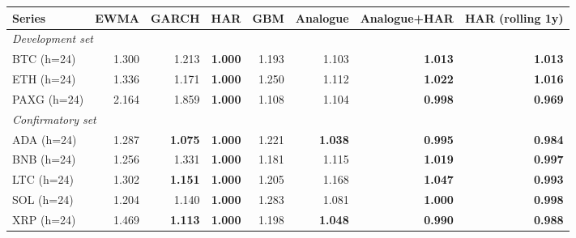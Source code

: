 \begin{tabular}{lrrrrrrr}
\toprule
Series & EWMA & GARCH & HAR & GBM & Analogue & Analogue+HAR & HAR (rolling 1y) \\
\midrule
\multicolumn{8}{l}{\textit{Development set}}\\
BTC (h=24) & 1.300 & 1.213 & \textbf{1.000} & 1.193 & 1.103 & \textbf{1.013} & \textbf{1.013}\\
ETH (h=24) & 1.336 & 1.171 & \textbf{1.000} & 1.250 & 1.112 & \textbf{1.022} & \textbf{1.016}\\
PAXG (h=24) & 2.164 & 1.859 & \textbf{1.000} & 1.108 & 1.104 & \textbf{0.998} & \textbf{0.969}\\
\multicolumn{8}{l}{\textit{Confirmatory set}}\\
ADA (h=24) & 1.287 & \textbf{1.075} & \textbf{1.000} & 1.221 & \textbf{1.038} & \textbf{0.995} & \textbf{0.984}\\
BNB (h=24) & 1.256 & 1.331 & \textbf{1.000} & 1.181 & 1.115 & \textbf{1.019} & \textbf{0.997}\\
LTC (h=24) & 1.302 & \textbf{1.151} & \textbf{1.000} & 1.205 & 1.168 & \textbf{1.047} & \textbf{0.993}\\
SOL (h=24) & 1.204 & 1.140 & \textbf{1.000} & 1.283 & 1.081 & \textbf{1.000} & \textbf{0.998}\\
XRP (h=24) & 1.469 & \textbf{1.113} & \textbf{1.000} & 1.198 & \textbf{1.048} & \textbf{0.990} & \textbf{0.988}\\
\bottomrule
\end{tabular}
